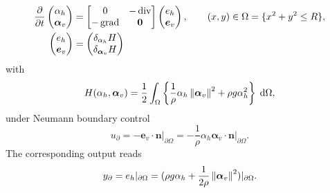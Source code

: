 \begin{equation}
\begin{aligned}
\diffp{}{t}
\begin{pmatrix}
\alpha_h \\
\bm{\alpha}_v \\
\end{pmatrix} &= 
\begin{bmatrix}
0 & -\div \\
-\grad & \bm{0}
\end{bmatrix}
\begin{pmatrix}
e_h\\
\bm{e}_v\\
\end{pmatrix}, \qquad (x,y) \in \Omega = \{x^2 + y^2 \le R \}, \\
\begin{pmatrix}
e_h\\
\bm{e}_v\\
\end{pmatrix} &= \begin{pmatrix}
\delta_{\alpha_h} H\\
\delta_{\bm{\alpha}_v} H\\
\end{pmatrix}
\end{aligned}
\end{equation}
with 
\begin{equation}
H(\alpha_h, \bm{\alpha}_v) = \energy{\frac{1}{\rho} \alpha_h \norm{\bm{\alpha}_v}^2 + \rho g \alpha_h^2},
\end{equation}
under Neumann boundary control 
\begin{equation}
	{u}_\partial = - \bm{e}_v \cdot \bm{n}\vert_{\partial\Omega} = - \frac{1}{\rho}\alpha_h \bm{\alpha}_v \cdot\bm{n}\vert_{\partial\Omega}. 
\end{equation}
The corresponding output reads
\begin{equation}
{y}_\partial = {e}_h\vert_{\partial\Omega} = (\rho g \alpha_h + \frac{1}{2\rho} \left\|\bm{\alpha}_v\right\|^2)\vert_{\partial\Omega}.
\end{equation}

